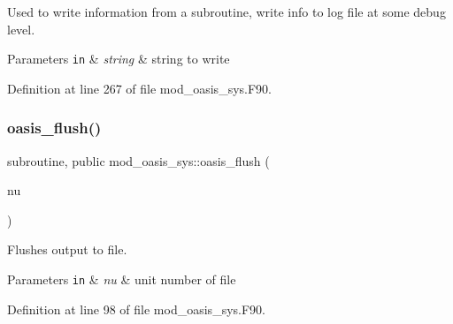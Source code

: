 Used to write information from a subroutine, write info to log file at some debug level. 


\begin{DoxyParams}[1]{Parameters}
\mbox{\tt in}  & {\em string} & string to write \\
\hline
\end{DoxyParams}


Definition at line 267 of file mod\+\_\+oasis\+\_\+sys.\+F90.

\mbox{\label{namespacemod__oasis__sys_ad152b6f737a7e06f8f1226af23d66361}} 
\subsubsection{\texorpdfstring{oasis\+\_\+flush()}{oasis\_flush()}}
{\footnotesize\ttfamily subroutine, public mod\+\_\+oasis\+\_\+sys\+::oasis\+\_\+flush (\begin{DoxyParamCaption}\item[{integer(kind=ip\+\_\+intwp\+\_\+p), intent(in)}]{nu }\end{DoxyParamCaption})}



Flushes output to file. 


\begin{DoxyParams}[1]{Parameters}
\mbox{\tt in}  & {\em nu} & unit number of file \\
\hline
\end{DoxyParams}


Definition at line 98 of file mod\+\_\+oasis\+\_\+sys.\+F90.

\mbox{\label{namespacemod__oasis__sys_a27e13d259fbecbfe09e750d16f50ef25}} 
